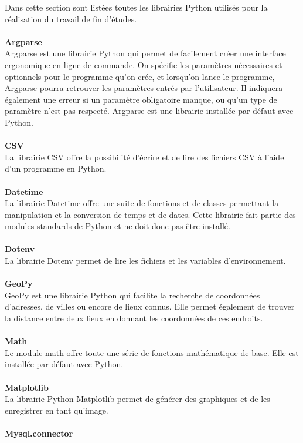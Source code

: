 \documentclass[11pt]{article}
\begin{document}
Dans cette section sont listées toutes les librairies Python utilisés pour la réalisation du travail de fin d'études.\\
\\
\textbf{Argparse}\\
Argparse est une librairie Python qui permet de facilement créer une interface ergonomique en ligne de commande.
On spécifie les paramètres nécessaires et optionnels pour le programme qu'on crée, et lorsqu'on lance le programme, Argparse pourra retrouver les paramètres entrés par l'utilisateur.
Il indiquera également une erreur si un paramètre obligatoire manque, ou qu'un type de paramètre n'est pas respecté.
Argparse est une librairie installée par défaut avec Python.\\
\\
\textbf{CSV}\\
La librairie CSV offre la possibilité d'écrire et de lire des fichiers CSV à l'aide d'un programme en Python.\\
\\
\textbf{Datetime}\\
La librairie Datetime offre une suite de fonctions et de classes permettant la manipulation et la conversion de temps et de dates.
Cette librairie fait partie des modules standards de Python et ne doit donc pas être installé.\\
\\
\textbf{Dotenv}\\
La librairie Dotenv permet de lire les fichiers et les variables d'environnement.\\
\\
\textbf{GeoPy}\\
GeoPy est une librairie Python qui facilite la recherche de coordonnées d'adresses, de villes ou encore de lieux connus.
Elle permet également de trouver la distance entre deux lieux en donnant les coordonnées de ces endroits.\\
\\
\textbf{Math}\\
Le module math offre toute une série de fonctions mathématique de base.
Elle est installée par défaut avec Python.\\
\\
\textbf{Matplotlib}\\
La librairie Python Matplotlib permet de générer des graphiques et de les enregistrer en tant qu'image.\\
\\
\textbf{Mysql.connector}\\
\end{document}
